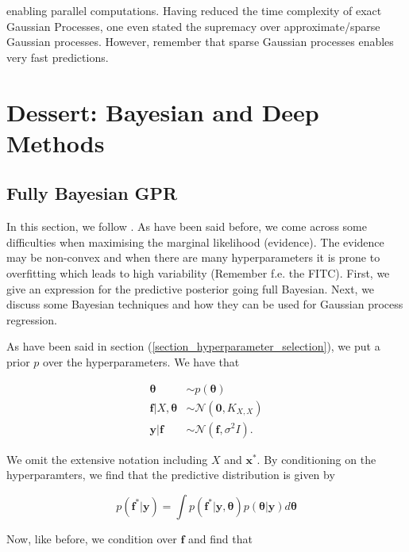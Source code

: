 \documentclass[12pt,a4paper,oneside]{book}
\begin{document}
enabling parallel computations. Having reduced the time complexity of exact Gaussian Processes, one even stated the supremacy over approximate/sparse Gaussian processes. However, remember that sparse Gaussian processes enables very fast predictions.




\chapter{Dessert: Bayesian and Deep Methods}\label{Fully Bayesian GPR}

\section{Fully Bayesian GPR}

In this section, we follow \cite{lalchand2019approximate}. As have been said before, we come across some difficulties when maximising the marginal likelihood  (evidence).  The evidence may be non-convex and when there are many hyperparameters it is prone to overfitting which leads to high variability (Remember f.e. the FITC). First, we give an expression for the predictive posterior going full Bayesian. Next, we discuss some Bayesian techniques  and how they can be used for Gaussian process regression.

As have been said in section (\ref{section_hyperparameter_selection}), we put a prior $p$ over the hyperparameters. We have that 

\begin{equation}
\begin{aligned}
\bm{\theta} &\sim p(\bm{\theta}) \\
\bm{f}| X, \bm{\theta} &\sim \mathcal{N}(\bm{0}, K_{X,X}) \\
\bm{y} | \bm{f} &\sim \mathcal{N}(\bm{f}, \sigma^2 I ).
\end{aligned} 
\end{equation}

We omit the extensive notation including $X$ and $\bm{x}^{\ast}$. By conditioning on the hyperparamters, we find that the predictive distribution is given by

\begin{equation}
p(\bm{f}^{\ast} | \bm{y} ) = \int p(\bm{f}^{\ast} | \bm{y}, \bm{\theta} ) p (\bm{\theta} | \bm{y})  d \bm{\theta}
\end{equation}

Now, like before, we condition over $\bm{f}$ and find that 
\end{document}
